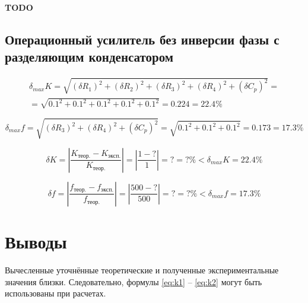 \textbf{TODO}

\subsection{Операционный усилитель без инверсии фазы с разделяющим конденсатором}

\begin{displaymath}
\begin{aligned}
	\delta_{max} K = \sqrt{(\delta R_1)^2 + (\delta R_2)^2 + (\delta R_3)^2 + (\delta R_4)^2 + (\delta C_p)^2} = \\ = \sqrt{0.1^2 + 0.1^2 + 0.1^2 + 0.1^2 + 0.1^2} = 0.224 = 22.4 \%
\end{aligned}
\end{displaymath}

\begin{displaymath}
	\delta_{max} f = \sqrt{(\delta R_3)^2 + (\delta R_4)^2 + (\delta C_p)^2} =  \sqrt{0.1^2 + 0.1^2 + 0.1^2} = 0.173 = 17.3 \%
\end{displaymath}

\begin{displaymath}
	\delta K = \left|\frac{K_\text{теор.} - K_\text{эксп.}}{K_\text{теор.}} \right| = \left|\frac{1 - ?}{1}\right| = ? = ?\% < \delta_{max} K = 22.4\%
\end{displaymath}

\begin{displaymath}
	\delta f = \left|\frac{f_\text{теор.} - f_\text{эксп.}}{f_\text{теор.}} \right| = \left|\frac{500 - ?}{500}\right| = ? = ?\% < \delta_{max} f = 17.3\%
\end{displaymath}

\section{Выводы}

Вычесленные уточнённые теоретические и полученные экспериментальные значения близки. Следовательно, формулы \ref{eq:k1} -- \ref{eq:k2} могут быть использованы при расчетах.

